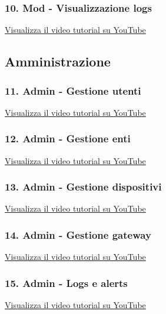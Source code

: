 \subsubsection{10. Mod - Visualizzazione logs}
\href{https://www.youtube.com/watch?v=PjySMOLCtMA&list=PLPKYjnuIh1FA3b3jn_bwY_ztYzaFn2mIT&index=13}
{Visualizza il video tutorial su YouTube}

\subsection{Amministrazione}

\subsubsection{11. Admin - Gestione utenti}
\href{https://www.youtube.com/watch?v=PjySMOLCtMA&list=PLPKYjnuIh1FA3b3jn_bwY_ztYzaFn2mIT&index=14}
{Visualizza il video tutorial su YouTube}

\subsubsection{12. Admin - Gestione enti}
\href{https://www.youtube.com/watch?v=PjySMOLCtMA&list=PLPKYjnuIh1FA3b3jn_bwY_ztYzaFn2mIT&index=15}
{Visualizza il video tutorial su YouTube}

\subsubsection{13. Admin - Gestione dispositivi}
\href{https://www.youtube.com/watch?v=PjySMOLCtMA&list=PLPKYjnuIh1FA3b3jn_bwY_ztYzaFn2mIT&index=16}
{Visualizza il video tutorial su YouTube}

\subsubsection{14. Admin - Gestione gateway}
\href{https://www.youtube.com/watch?v=PjySMOLCtMA&list=PLPKYjnuIh1FA3b3jn_bwY_ztYzaFn2mIT&index=17}
{Visualizza il video tutorial su YouTube}

\subsubsection{15. Admin - Logs e alerts}
\href{https://www.youtube.com/watch?v=PjySMOLCtMA&list=PLPKYjnuIh1FA3b3jn_bwY_ztYzaFn2mIT&index=18}
{Visualizza il video tutorial su YouTube}
